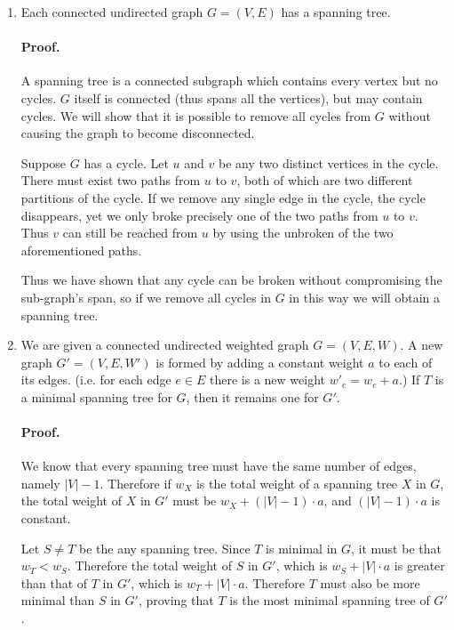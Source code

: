 \documentclass{article}
\begin{document}
\begin{enumerate}
	\item
		Each connected undirected graph \(G=(V,E)\) has a spanning tree.

		\paragraph{Proof.} A spanning tree is a connected subgraph which contains every vertex but no cycles. \(G\) itself is connected (thus spans all the vertices), but may contain cycles. We will show that it is possible to remove all cycles from \(G\) without causing the graph to become disconnected.

		Suppose \(G\) has a cycle. Let \(u\) and \(v\) be any two distinct vertices in the cycle. There must exist two paths from \(u\) to \(v\), both of which are two different partitions of the cycle. If we remove any single edge in the cycle, the cycle disappears, yet we only broke precisely one of the two paths from \(u\) to \(v\). Thus \(v\) can still be reached from \(u\) by using the unbroken of the two aforementioned paths.

		Thus we have shown that any cycle can be broken without compromising the sub-graph's span, so if we remove all cycles in \(G\) in this way we will obtain a spanning tree.

	\item
		We are given a connected undirected weighted graph \(G=(V,E,W)\). A new graph \(G' = (V, E, W')\) is formed by adding a constant weight \(a\) to each of its edges. (i.e. for each edge \(e \in E\) there is a new weight \(w'_e = w_e + a\).) If \(T\) is a minimal spanning tree for \(G\), then it remains one for \(G'\).

		\paragraph{Proof.} We know that every spanning tree must have the same number of edges, namely \(|V| - 1\). Therefore if \(w_X\) is the total weight of a spanning tree \(X\) in \(G\), the total weight of \(X\) in \(G'\) must be \(w_X + (|V| - 1) \cdot a\), and \((|V| - 1) \cdot a\) is constant.

		Let \(S \neq T\) be the any spanning tree. Since \(T\) is minimal in \(G\), it must be that \(w_T < w_S\). Therefore the total weight of \(S\) in \(G'\), which is \(w_S + |V| \cdot a\) is greater than that of \(T\) in \(G'\), which is \(w_T + |V| \cdot a\). Therefore \(T\) must also be more minimal than \(S\) in \(G'\), proving that \(T\) is the most minimal spanning tree of \(G'\).


\end{enumerate}
\end{document}
